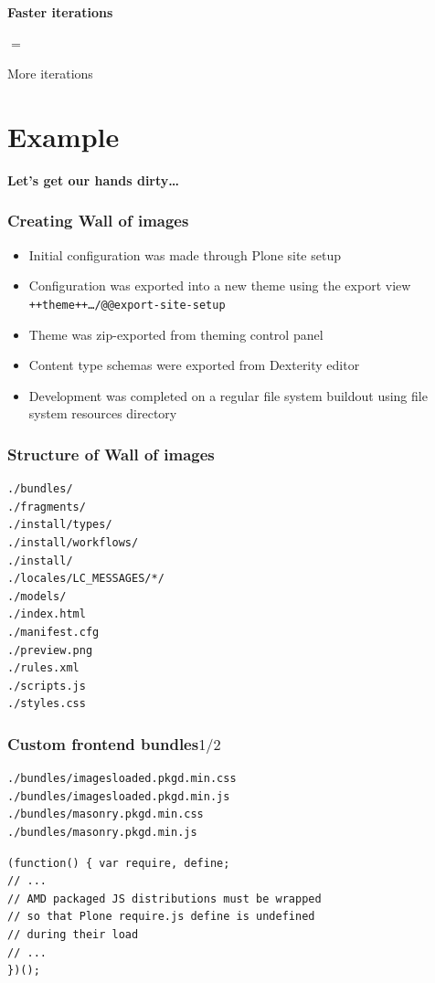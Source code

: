\documentclass[aspectratio=43]{beamer}
\begin{document}
\begin{frame}[plain,t]
  \vspace{8em}
  \huge
  \bfseries
  \centering
  Faster iterations
  \par
  $=$
  \par
  More iterations
\end{frame}

\section{Example}

\begin{frame}[plain,c]
  \huge
  \bfseries
  \centering
  \vspace{1cm}
  Let's get our hands dirty\dots
\end{frame}

\begin{frame}[plain,t]
  \frametitle{Creating Wall of images}
  \begin{itemize}[<+->]
  \setlength{\itemsep}{1em}
  \item Initial configuration was made through Plone site setup
  \item Configuration was exported into a new theme using the export view
  \texttt{++theme++\ldots/@@export-site-setup}
  \item Theme was zip-exported from theming control panel
  \item Content type schemas were exported from Dexterity editor
  \item Development was completed on a regular file system buildout
  using file system resources directory
  \end{itemize}
\end{frame}

\begin{frame}
  \frametitle{Structure of Wall of images}
  \begin{verbatim}
./bundles/
./fragments/
./install/types/
./install/workflows/
./install/
./locales/LC_MESSAGES/*/
./models/
./index.html
./manifest.cfg
./preview.png
./rules.xml
./scripts.js
./styles.css
  \end{verbatim}
\end{frame}

\begin{frame}
\frametitle{Custom frontend bundles\hfill$1/2$}
\begin{verbatim}
./bundles/imagesloaded.pkgd.min.css
./bundles/imagesloaded.pkgd.min.js
./bundles/masonry.pkgd.min.css
./bundles/masonry.pkgd.min.js
\end{verbatim}
\begin{verbatim}
(function() { var require, define;
// ...
// AMD packaged JS distributions must be wrapped
// so that Plone require.js define is undefined
// during their load
// ...
})();
\end{verbatim}
\end{frame}
\end{document}

